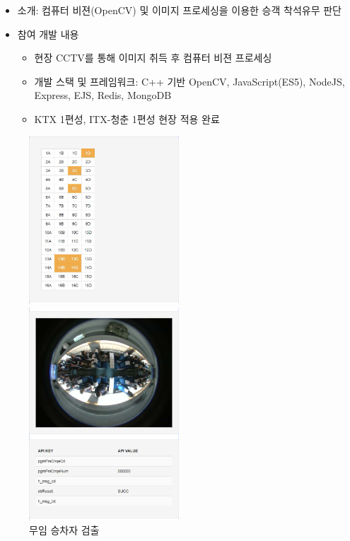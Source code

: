 \begin{itemize}[label=]
	\item 소개: 컴퓨터 비젼(OpenCV) 및 이미지 프로세싱을 이용한 승객 착석유무 판단
	\item 참여 개발 내용
	      \begin{itemize}[label=]
		      \item 현장 CCTV를 통해 이미지 취득 후 컴퓨터 비젼 프로세싱
		      \item 개발 스택 및 프레임워크: C++ 기반 OpenCV, JavaScript(ES5), NodeJS, Express, EJS, Redis, MongoDB
		      \item KTX 1편성, ITX-청춘 1편성 현장 적용 완료
	      \end{itemize}
\end{itemize}

\begin{figure}[!ht]
	\begin{fullwidth}
		\parbox{0.5\textwidth}{
			\centering
			\includegraphics[width=0.5\textwidth]{images/korail_seat_01_01.png}
			\caption*{무임 승차자 검출}
		}\qquad
		\parbox{0.5\textwidth}{
			\centering
			\includegraphics[width=0.5\textwidth]{images/korail_seat_01_02.png}
}
\end{fullwidth}
\end{figure}
